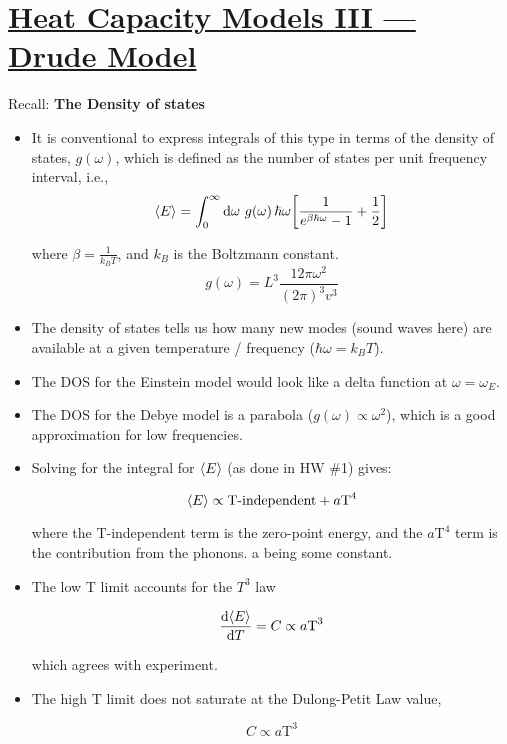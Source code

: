 \section[Heat Capacity Models III — Drude Model]{\hyperlink{toc}{Heat Capacity Models III — Drude Model}}

Recall:
\textbf{The Density of states}

\begin{itemize}
    \item It is conventional to express integrals of this type in terms of the density of states, $g(\omega)$, which is defined as the number of states per unit frequency interval, i.e.,
    \[ \avg{E} = \int_{0}^{\infty} \dd{\omega} \, g(\omega) \, \hbar \omega \brackets*{\frac{1}{e^{\beta \hbar \omega} - 1} + \frac{1}{2}} \]


    where $\beta = \frac{1}{k_B T}$, and $k_B$ is the Boltzmann constant.
    \[ g(\omega) = L^3 \frac{12 \pi \omega^2}{(2 \pi)^3 v^3} \]

    \item The density of states tells us how many new modes (sound waves here) are available at a given temperature / frequency ($\hbar \omega = k_B T$).

    \item The DOS for the Einstein model would look like a delta function at $\omega = \omega_E$.
    \item The DOS for the Debye model is a parabola ($g(\omega) \propto \omega^2$), which is a good approximation for low frequencies.

    \item Solving for the integral for $\langle E \rangle$ (as done in HW \#1) gives:
    
    \[ \langle E \rangle \propto \text{T-independent} + a \text{T}^4 \]

    where the T-independent term is the zero-point energy, and the $a \text{T}^4$ term is the contribution from the phonons. a being some constant.

    \item The low T limit accounts for the $T^3$ law
    
    \[ \dv{\langle E \rangle}{T} = C \propto a \text{T}^3 \]

    which agrees with experiment.

    \item The high T limit does not saturate at the Dulong-Petit Law value,
    
    \[ C \propto a \text{T}^3 \]


\end{itemize}
